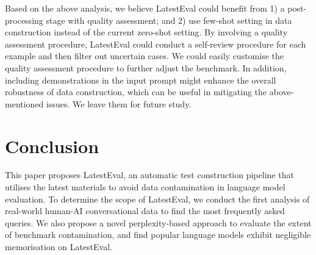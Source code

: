 \documentclass[letterpaper]{article} %
\begin{document}
Based on the above analysis, we believe LatestEval could benefit from 1) a post-processing stage with quality assessment; and 2) use few-shot setting in data construction instead of the current zero-shot setting. By involving a quality assessment procedure, LatestEval could conduct a self-review procedure for each example and then filter out uncertain cases. We could easily customise the quality assessment procedure to further adjust the benchmark. In addition, including demonstrations in the input prompt might enhance the overall robustness of data construction, which can be useful in mitigating the above-mentioned issues. We leave them for future study.

\section{Conclusion}

This paper proposes LatestEval, an automatic test construction pipeline that utilises the latest materials to avoid data contamination in language model evaluation. To determine the scope of LatestEval, we conduct the first analysis of real-world human-AI conversational data to find the most frequently asked queries. We also propose a novel perplexity-based approach to evaluate the extent of benchmark contamination, and find popular language models exhibit negligible memorisation on LatestEval.

\nocite{li2023compressing,li2023unlocking}


\end{document}
